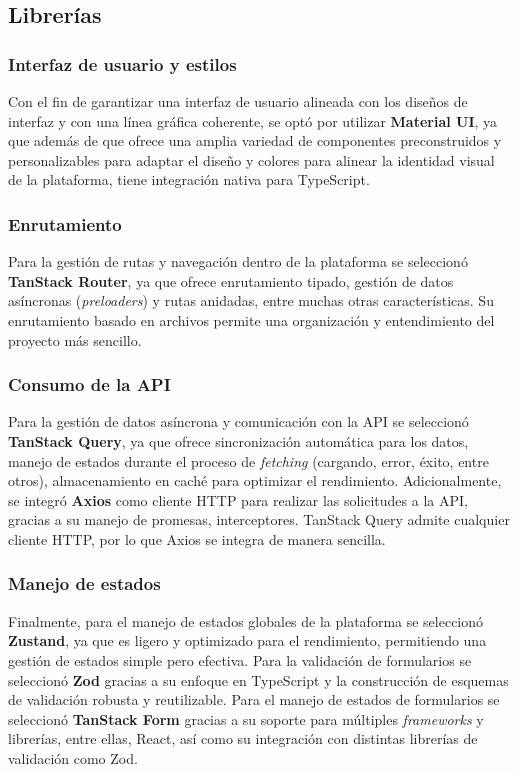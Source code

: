 \subsection{Librerías}

\subsubsection{Interfaz de usuario y estilos}
Con el fin de garantizar una interfaz de usuario alineada con los diseños de interfaz y con una línea gráfica coherente,
se optó por utilizar \textbf{Material UI}, ya que además de que ofrece una amplia variedad de componentes preconstruidos
y personalizables para adaptar el diseño y colores para alinear la identidad visual de la plataforma, tiene integración
nativa para TypeScript.

\subsubsection{Enrutamiento}
Para la gestión de rutas y navegación dentro de la plataforma se seleccionó \textbf{TanStack Router}, ya que ofrece
enrutamiento tipado, gestión de datos asíncronas (\textit{preloaders}) y rutas anidadas, entre muchas otras
características. Su enrutamiento basado en archivos permite una organización y entendimiento del proyecto más sencillo.

\subsubsection{Consumo de la API}
Para la gestión de datos asíncrona y comunicación con la API se seleccionó \textbf{TanStack Query}, ya que ofrece
sincronización automática para los datos, manejo de estados durante el proceso de \textit{fetching}
(cargando, error, éxito, entre otros), almacenamiento en caché para optimizar el rendimiento. Adicionalmente, se integró
\textbf{Axios} como cliente HTTP para realizar las solicitudes a la API, gracias a su manejo de promesas, interceptores.
TanStack Query admite cualquier cliente HTTP, por lo que Axios se integra de manera sencilla.

\subsubsection{Manejo de estados}
Finalmente, para el manejo de estados globales de la plataforma se seleccionó \textbf{Zustand}, ya que es ligero y
optimizado para el rendimiento, permitiendo una gestión de estados simple pero efectiva. Para la validación de
formularios se seleccionó \textbf{Zod} gracias a su enfoque en TypeScript y la construcción de esquemas de validación
robusta y reutilizable. Para el manejo de estados de formularios se seleccionó \textbf{TanStack Form} gracias a su
soporte para múltiples \textit{frameworks} y librerías, entre ellas, React, así como su integración con distintas
librerías de validación como Zod.

